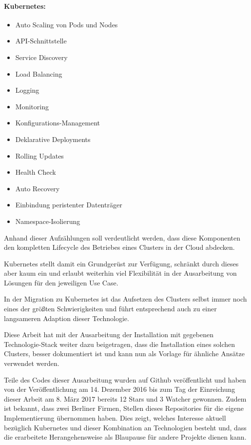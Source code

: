 \paragraph{Kubernetes:}
\begin{itemize}
  \item Auto Scaling von Pods und Nodes
  \item API-Schnittstelle
  \item Service Discovery
  \item Load Balancing
  \item Logging
  \item Monitoring
  \item Konfigurations-Management
  \item Deklarative Deployments
  \item Rolling Updates
  \item Health Check
  \item Auto Recovery
  \item Einbindung peristenter Datentr\"ager
  \item Namespace-Isolierung
\end{itemize}

Anhand dieser Aufz\"ahlungen soll verdeutlicht werden, dass diese Komponenten
den kompletten Lifecycle des Betriebes eines Clusters in der Cloud abdecken.

Kubernetes stellt damit ein Grundger\"ust zur Verf\"ugung, schr\"ankt
durch dieses aber kaum ein und erlaubt weiterhin viel Flexibilit\"at
in der Ausarbeitung von L\"osungen f\"ur den jeweiligen Use Case.

In der Migration zu Kubernetes ist das Aufsetzen des Clusters
selbst immer noch eines der gr\"oßten Schwierigkeiten
und f\"uhrt entsprechend auch zu einer langsameren Adaption dieser Technologie.

Diese Arbeit hat mit der Ausarbeitung der Installation
mit gegebenen Technologie-Stack weiter dazu beigetragen,
dass die Installation eines solchen Clusters,
besser dokumentiert ist und kann nun als Vorlage f\"ur \"ahnliche
Ans\"atze verwendet werden.

Teile des Codes dieser Ausarbeitung wurden auf Github
ver\"offentlicht \cite{steph}
und haben
von der Ver\"offentlichung am 14. Dezember 2016 bis zum Tag der Einreichung
dieser Arbeit am 8. M\"arz 2017 bereits 12 Stars und 3 Watcher gewonnen.
Zudem ist bekannt, dass zwei Berliner Firmen, Stellen dieses Repositories
f\"ur die eigene Implementierung \"ubernommen haben.
Dies zeigt, welches Interesse aktuell bez\"uglich Kubernetes und dieser
Kombination an Technologien besteht und, dass die erarbeitete Herangehensweise
als Blaupause f\"ur andere Projekte dienen kann.

